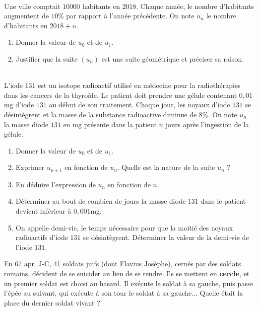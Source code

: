 \documentclass[main.tex]{subfiles}
\begin{document}
\begin{exercise}\label{chapter05:exercise:suites26}  \hfill \\
Une ville comptait $10000$ habitants en $2018$. Chaque année, le nombre d'habitants augmentent de $10\%$ par rapport à l'année précédente. On note $u_n$ le nombre d'habitants en $2018+n$.
\begin{enumerate}[label=\arabic*),leftmargin=*] 
	\item Donner la valeur de $u_0$ et de $u_1$.
	\item Justifier que la suite $(u_n)$ est une suite géométrique et préciser sa raison.
\end{enumerate} 
\end{exercise}
\begin{exercise} \label{chapter05:exercise:suites27}  \hfill \\
L'iode $131$ est un isotope radioactif utilisé en médecine pour la radiothérapies dans les cancers de la thyroïde. Le patient doit prendre une gélule contenant $0,01$ mg  d'iode $131$ au début de son traitement. Chaque jour, les noyaux d'iode $131$ se désintègrent et la masse de la substance radioactive diminue de $8\%$. On note $u_n$ la masse diode $131$ en mg présente dans la patient $n$ jours après l'ingestion de la gélule.
\begin{enumerate}[label=\arabic*),leftmargin=*] 
	\item Donner la valeur de $u_0$ et de $u_1$.
	\item Exprimer $u_{n+1}$ en fonction de $u_n$. Quelle est la nature de la suite $u_n$ ?
	\item En déduire l'expression de $u_n$ en fonction de $n$.
	\item Déterminer au bout de combien de jours la masse diode $131$ dans le patient devient inférieur à $0,001$mg.
	\item On appelle demi-vie, le temps nécessaire pour que la moitié des noyaux radioactifs d'iode $131$ se désintègrent. Déterminer la valeur de la demi-vie de l'iode $131$.
\end{enumerate}


\begin{problem} \label{chapter05:exercise:suites28} 	En 67 apr. J-C, 41 soldats juifs (dont Flavius Josèphe), cernés par des soldats romains, décident de se suicider au lieu de se rendre. Ils se mettent en \textbf{cercle}, et un premier soldat est choisi au hasard. Il exécute le soldat à sa gauche, puis passe l'épée au suivant, qui exécute à son tour le soldat à sa gauche... Quelle était la place du dernier soldat vivant ? 
	

\end{problem}
\end{exercise}
\end{document}
